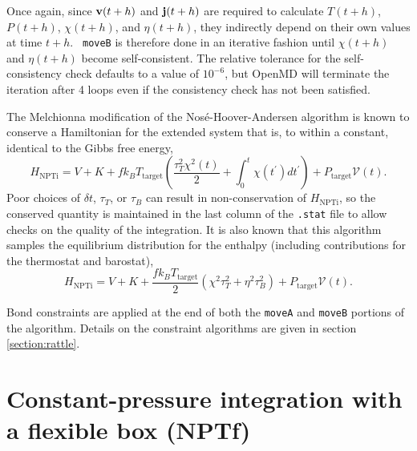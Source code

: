 \documentclass[]{book}
\begin{document}
Once again, since ${\bf v}(t + h)$ and ${\bf j}(t + h)$ are required
to calculate $T(t + h)$, $P(t + h)$, $\chi(t + h)$, and $\eta(t +
h)$, they indirectly depend on their own values at time $t + h$.  {\tt
moveB} is therefore done in an iterative fashion until $\chi(t + h)$
and $\eta(t + h)$ become self-consistent.  The relative tolerance for
the self-consistency check defaults to a value of $\mbox{10}^{-6}$,
but {\sc OpenMD} will terminate the iteration after 4 loops even if the
consistency check has not been satisfied.

The Melchionna modification of the Nos\'e-Hoover-Andersen algorithm is
known to conserve a Hamiltonian for the extended system that is, to
within a constant, identical to the Gibbs free energy,
\begin{equation}
H_{\mathrm{NPTi}} = V + K + f k_B T_{\mathrm{target}} \left(
\frac{\tau_{T}^2 \chi^2(t)}{2} + \int_{0}^{t} \chi(t^\prime) dt^\prime
\right) + P_{\mathrm{target}} \mathcal{V}(t).
\end{equation}
Poor choices of $\delta t$, $\tau_T$, or $\tau_B$ can result in
non-conservation of $H_{\mathrm{NPTi}}$, so the conserved quantity is
maintained in the last column of the {\tt .stat} file to allow checks
on the quality of the integration.  It is also known that this
algorithm samples the equilibrium distribution for the enthalpy
(including contributions for the thermostat and barostat), 
\begin{equation}
H_{\mathrm{NPTi}} = V + K + \frac{f k_B T_{\mathrm{target}}}{2} \left(
\chi^2 \tau_T^2 + \eta^2 \tau_B^2 \right) +  P_{\mathrm{target}}
\mathcal{V}(t). 
\end{equation}

Bond constraints are applied at the end of both the {\tt moveA} and
{\tt moveB} portions of the algorithm.  Details on the constraint
algorithms are given in section \ref{section:rattle}.

\section{\label{sec:NPTf}Constant-pressure integration with a
flexible box (NPTf)} 
\end{document}
